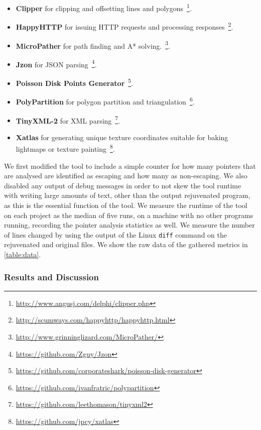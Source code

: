 \documentclass{mpaper}
\begin{document}
    \begin{itemize}
        \item \textbf{Clipper} for clipping and offsetting lines and polygons~\footnote{\url{http://www.angusj.com/delphi/clipper.php}}.
        \item \textbf{HappyHTTP} for issuing HTTP requests and processing responses~\footnote{\url{http://scumways.com/happyhttp/happyhttp.html}}.
        \item \textbf{MicroPather} for path finding and A* solving.~\footnote{\url{http://www.grinninglizard.com/MicroPather/}}.
        \item \textbf{Jzon} for JSON parsing~\footnote{\url{https://github.com/Zguy/Jzon}}.
        \item \textbf{Poisson Disk Points Generator}~\footnote{\url{https://github.com/corporateshark/poisson-disk-generator}}.
        \item \textbf{PolyPartition} for polygon partition and triangulation~\footnote{\url{https://github.com/ivanfratric/polypartition}}.
        \item \textbf{TinyXML-2} for XML parsing~\footnote{\url{https://github.com/leethomason/tinyxml2}}.
        \item \textbf{Xatlas} for generating unique texture coordinates suitable for baking lightmaps or texture painting~\footnote{\url{https://github.com/jpcy/xatlas}}.
    \end{itemize}
    
    We first modified the tool to include a simple counter for how many pointers that are analysed are identified as escaping and how many as non-escaping.
    We also disabled any output of debug messages in order to not skew the tool runtime with writing large amounts of text, other than the output rejuvenated program, as this is the essential function of the tool.
    We measure the runtime of the tool on each project as the median of five runs, on a machine with no other programs running, recording the pointer analysis statistics as well.
    We measure the number of lines changed by using the output of the Linux \texttt{diff} command on the rejuvenated and original files. 
    We show the raw data of the gathered metrics in \autoref{table:data}.
    
    \subsubsection{Results and Discussion}
    
\end{document}
